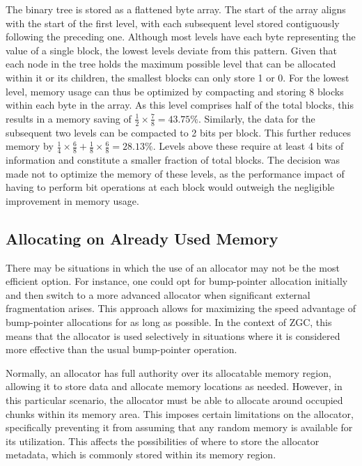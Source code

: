 The binary tree is stored as a flattened byte array. The start of the array aligns with the start of the first level, with each subsequent level stored contiguously following the preceding one. Although most levels have each byte representing the value of a single block, the lowest levels deviate from this pattern. Given that each node in the tree holds the maximum possible level that can be allocated within it or its children, the smallest blocks can only store 1 or 0. For the lowest level, memory usage can thus be optimized by compacting and storing 8 blocks within each byte in the array. As this level comprises half of the total blocks, this results in a memory saving of $\frac{1}{2}\times\frac{7}{8}=43.75\%$. Similarly, the data for the subsequent two levels can be compacted to 2 bits per block. This further reduces memory by $\frac{1}{4}\times\frac{6}{8}+\frac{1}{8}\times\frac{6}{8}=28.13\%$. Levels above these require at least 4 bits of information and constitute a smaller fraction of total blocks. The decision was made not to optimize the memory of these levels, as the performance impact of having to perform bit operations at each block would outweigh the negligible improvement in memory usage.

\subsection{Allocating on Already Used Memory} \label{sec:freerangeexpl}
There may be situations in which the use of an allocator may not be the most efficient option. For instance, one could opt for bump-pointer allocation initially and then switch to a more advanced allocator when significant external fragmentation arises. This approach allows for maximizing the speed advantage of bump-pointer allocations for as long as possible. In the context of ZGC, this means that the allocator is used selectively in situations where it is considered more effective than the usual bump-pointer operation.

\newpage
Normally, an allocator has full authority over its allocatable memory region, allowing it to store data and allocate memory locations as needed. However, in this particular scenario, the allocator must be able to allocate around occupied chunks within its memory area. This imposes certain limitations on the allocator, specifically preventing it from assuming that any random memory is available for its utilization. This affects the possibilities of where to store the allocator metadata, which is commonly stored within its memory region.

